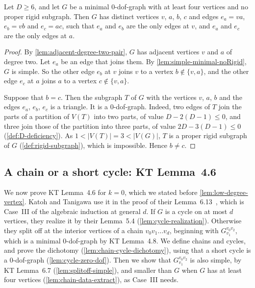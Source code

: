 \begin{lemma}
  \label{lem:chain-data-of-noRigid}
  \leanok
  Let $D \ge 6$, and let $G$ be a minimal $0$-dof-graph with at least
  four vertices and no proper rigid subgraph. Then $G$ has distinct
  vertices $v$, $a$, $b$, $c$ and edges $e_a = va$, $e_b = vb$ and
  $e_c = ac$, such that $e_a$ and $e_b$ are the only edges at $v$, and
  $e_a$ and $e_c$ are the only edges at $a$.
\end{lemma}
\begin{proof}
  \leanok
  By \cref{lem:adjacent-degree-two-pair}, $G$ has adjacent vertices $v$
  and $a$ of degree two. Let $e_a$ be an edge that joins them. By
  \cref{lem:simple-minimal-noRigid}, $G$ is simple. So the other edge
  $e_b$ at $v$ joins $v$ to a vertex $b \notin \{v, a\}$, and the other
  edge $e_c$ at $a$ joins $a$ to a vertex $c \notin \{v, a\}$.

  Suppose that $b = c$. Then the subgraph $T$ of $G$ with the vertices
  $v$, $a$, $b$ and the edges $e_a$, $e_b$, $e_c$ is a triangle. It is a
  $0$-dof-graph. Indeed, two edges of $T$ join the parts of a partition
  of $V(T)$ into two parts, of value $D - 2(D-1) \le 0$, and three join
  those of the partition into three parts, of value
  $2D - 3(D-1) \le 0$ (\cref{def:D-deficiency}). As
  $1 < |V(T)| = 3 < |V(G)|$, $T$ is a proper rigid subgraph of $G$
  (\cref{def:rigid-subgraph}), which is impossible. Hence $b \neq c$.
\end{proof}

\subsection{A chain or a short cycle: KT Lemma~4.6}

We now prove KT Lemma~4.6 for $k = 0$, which we stated before
\cref{lem:low-degree-vertex}. Katoh and Tanigawa use it in the proof of
their Lemma~6.13~\cite[p.~692]{katohTanigawa2011}, which is Case~III of
the algebraic induction at general $d$. If $G$ is a cycle on at most $d$
vertices, they realize it by their Lemma~5.4
(\cref{lem:cycle-realization}). Otherwise they split off at the interior
vertices of a chain $v_0 v_1 \dots v_d$, beginning with
$G_{v_1}^{v_0 v_2}$, which is a minimal $0$-dof-graph by KT Lemma~4.8.
We define chains and cycles, and prove the dichotomy
(\cref{lem:chain-cycle-dichotomy}), using that a short cycle is a
$0$-dof-graph (\cref{lem:cycle-zero-dof}). Then we show that
$G_{v_1}^{v_0 v_2}$ is also simple, by KT Lemma~6.7
(\cref{lem:splitoff-simple}), and smaller than $G$ when $G$ has at
least four vertices (\cref{lem:chain-data-extract}), as Case~III needs.

